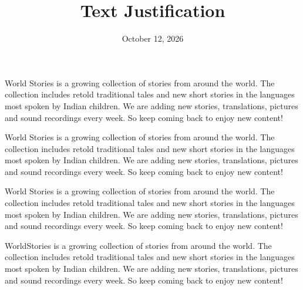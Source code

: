 \documentclass[12pt]{article}
\begin{document}
\title{Text Justification}
\date{October 12, 2026}
\maketitle
World Stories is a growing collection of stories from around the world. The collection includes retold traditional tales and new short stories in the languages most spoken by Indian children. We are adding new stories, translations, pictures and sound recordings every week. So keep coming back to enjoy new content!\\

\raggedright World Stories is a growing collection of stories from around the world. The collection includes retold traditional tales and new short stories in the languages most spoken by Indian children. We are adding new stories, translations, pictures and sound recordings every week. So keep coming back to enjoy new content!\newline

\raggedleft World Stories is a growing collection of stories from around the world. The collection includes retold traditional tales and new short stories in the languages most spoken by Indian children. We are adding new stories, translations, pictures and sound recordings every week. So keep coming back to enjoy new content!\newline

\centering WorldStories is a growing collection of stories from around the world. The collection includes retold traditional tales and new short stories in the languages most spoken by Indian children.  We are adding new stories, translations, pictures and sound recordings every week. So keep coming back to enjoy new content! 
\end{document}

